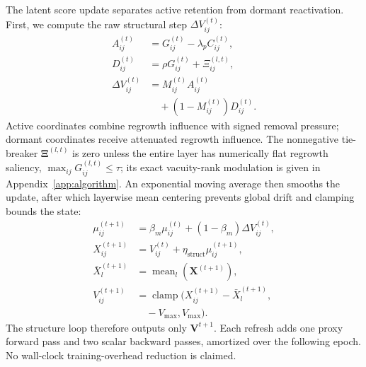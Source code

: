 \documentclass[letterpaper]{article}
\begin{document}
The latent score update separates active retention from dormant reactivation. First, we compute the raw structural step $\Delta V_{ij}^{(t)}$:
\begin{equation}\label{eq:score_step}
\begin{aligned}
    A_{ij}^{(t)} &= G_{ij}^{(t)}-\lambda_p C_{ij}^{(t)},\\
    D_{ij}^{(t)} &= \rho G_{ij}^{(t)}+\Xi_{ij}^{(l,t)},\\
    \Delta V_{ij}^{(t)}
    &=M_{ij}^{(t)}A_{ij}^{(t)}\\
    &\quad+\left(1-M_{ij}^{(t)}\right)D_{ij}^{(t)}.
\end{aligned}
\end{equation}
Active coordinates combine regrowth influence with signed removal pressure; dormant coordinates receive attenuated regrowth influence. The nonnegative tie-breaker $\bm\Xi^{(l,t)}$ is zero unless the entire layer has numerically flat regrowth saliency, $\max_{ij}G_{ij}^{(l,t)}\le\tau$; its exact vacuity-rank modulation is given in Appendix~\ref{app:algorithm}. An exponential moving average then smooths the update, after which layerwise mean centering prevents global drift and clamping bounds the state:
\begin{equation}\label{eq:score_update}
\begin{aligned}
    \mu_{ij}^{(t+1)} &= \beta_m\mu_{ij}^{(t)} +(1-\beta_m)\Delta V_{ij}^{(t)},\\
    X_{ij}^{(t+1)} &= V_{ij}^{(t)}+\eta_{\text{struct}}\mu_{ij}^{(t+1)},\\
    \bar X_l^{(t+1)}
    &=\operatorname{mean}_{l}(\bm X^{(t+1)}),\\
    V_{ij}^{(t+1)}
    &=\operatorname{clamp}\!\bigl(
    X_{ij}^{(t+1)}-\bar X_l^{(t+1)},\\
    &\quad -V_{\max},V_{\max}\bigr).
\end{aligned}
\end{equation}
The structure loop therefore outputs only $\bm V^{t+1}$. Each refresh adds one proxy forward pass and two scalar backward passes, amortized over the following epoch. No wall-clock training-overhead reduction is claimed.
\end{document}
